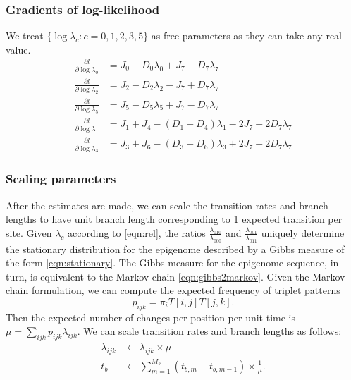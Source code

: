 \documentclass[11pt]{article}
\begin{document}
\subsubsection{Gradients of log-likelihood}
We treat $\{\log\lambda_c: c = 0,1,2,3,5\}$ as free parameters as they can take any real value.
\begin{equation}
  \begin{aligned}
    \frac{\partial l}{\partial \log\lambda_0} &= J_0 - D_0\lambda_0 + J_7 - D_7\lambda_7\\
    \frac{\partial l}{\partial \log\lambda_2} &= J_2 - D_2\lambda_2 - J_7 + D_7\lambda_7 \\
    \frac{\partial l}{\partial \log\lambda_5} &= J_5 - D_5\lambda_5 + J_7 - D_7\lambda_7\\
    \frac{\partial l}{\partial \log\lambda_1} &= J_1 + J_4 - (D_1 + D_4)\lambda_1 - 2J_7 + 2D_7\lambda_7\\
    \frac{\partial l}{\partial \log\lambda_3} &= J_3 + J_6 - (D_3 + D_6)\lambda_3 + 2J_7 - 2D_7\lambda_7
  \end{aligned}
\end{equation}

\subsubsection{Scaling parameters}
After the estimates are made, we can scale the transition rates and
branch lengths to have unit branch length corresponding to 1 expected
transition per site.  Given $\lambda_{c}$ according to
\eqref{eqn:rel}, the ratios $\frac{\lambda_{010}}{\lambda_{000}}$ and
$\frac{\lambda_{001}}{\lambda_{011}}$ uniquely determine the
stationary distribution for the epigenome described by a Gibbs measure
of the form \eqref{eqn:stationary}. The Gibbs measure for the
epigenome sequence, in turn, is equivalent to the Markov chain
\eqref{eqn:gibbs2markov}. Given the Markov chain formulation, we can
compute the expected frequency of triplet patterns
\[
p_{ijk} = \pi_i T[i,j] T[j,k].
\]
Then the expected number of changes per position per
unit time is $\mu = \sum_{ijk}p_{ijk}\lambda_{ijk}$. We can scale transition
rates and branch lengths as follows:
\begin{equation}\label{eqn:tidentifiable}
  \begin{aligned}
    \lambda_{ijk} &\leftarrow \lambda_{ijk}\times \mu \\
    t_b &\leftarrow \sum\limits_{m=1}^{M_b} (t_{b,m} - t_{b,m-1}) \times \frac{1}{\mu}.
  \end{aligned}
\end{equation}
\end{document}

